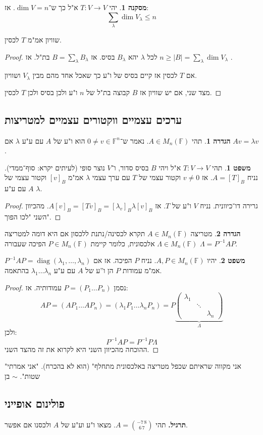 \documentclass[a4paper]{article}
\DeclareMathOperator{\diag}    {diag}
\newcommand\F         {\mathbb{F}}
\newcommand\co        {\colon}
\newcommand\pms[1]    {\begin{pmatrix}
		#1
\end{pmatrix}}
\renewcommand\lg      {\lambda}
\newcommand\Lg        {\Lambda}
\newcommand\op    {^{-1}}
\theoremstyle{definition}
\newtheorem{Theorem}{משפט}
\newtheorem{definition}{הגדרה}
\newtheorem{Collary}{מסקנה}
\newcommand\cola [1] {\begin{Collary}#1\end{Collary}}
\newcommand\theo  [1] {\begin{Theorem}#1\end{Theorem}}
\newcommand\defi  [1] {\begin{definition}#1\end{definition}}
\begin{document}
	\cola{יהי $T \co V \to V$ א"ל כך ש־$\dim V = n$. אז: 
		\[ \sum_\lg \dim V_\lg \le n \]}
	שוויון אמ"מ $T$ לכסין. 
	
	\begin{proof}
		לכל $\lg$ יהא $B_\lg$ בסיס. אז $B = \sum_{\lg}B_\lg$ בת"ל. אז $n \ge |B| = \sum_\lg \dim V_\lg$ . 
		
		אם $T$ לכסין אז קיים בסיס של ו"ע כך שאכל אחד מהם מבין $V_\lg$ ושוויון. 
		
		מצד שני, אם יש שוויון אז $B$ קבוצה בת"ל של $n$ ו"ע ולכן בסיס ולכן $T$ לכסין. 
	\end{proof}
	
	\subsection{ערכים עצמיים ווקטורים עצמיים למטריצות}
	\defi{תהי $A \in M_n(\F)$. נאמר ש־$0 \neq v \in \F^n$ הוא ו"ע של $A$ עם ע"ע $\lg$ אם $Av = \lg v$. }
	
	\theo{תהי $T \co V \to V$ א"ל ויהי $B$ בסיס סדור, ו־$V$ נוצר סופי (לעיתים יקרא: סוף־ממדי). נניח $A = [T]_B$. אז $v \neq 0$ וקטור עצמי של $T$ עם ערך עצמי $\lg$ אמ"מ $[v]_B$ וקטור עצמי של $A$ עם ע"ע $\lg$. }
	
	\begin{proof}
		גרירה דו־כיוונית. 
		נניח $V$ ו"ע של $T$. אז $A[v]_B = [Tv]_B = [\lg_v]_B \lg[v]_B$. מהכיוון השני "לכו הפוך". 
	\end{proof}
	
	\defi{מטריצה $A \in M_n(\F)$ תקרא לכסינה/נתנת ללכסון אם היא דומה למטריצה $\Lambda \in M_n(\F)$ אלכסונית, כלומר קיימת $P \in M_n(\F)$ הפיכה שעבורה $\Lg = P\op AP$. }
	
	\theo{יהיו $A, P \in M_n(\F)$. נניח $P$ הפיכה. אז אם $P\op AP = \diag(\lg_1, \dots, \lg_n)$ אמ"מ עמודות $P$ הן ו''ע של $A$ עם ע"ע $\lg_1 \dots \lg_n$ בהתאמה. }
	
	\begin{proof}
		נסמן $P = (P_1 \dots P_n)$ עמודותיה. אז: 
		\[ AP = (AP_1 \dots AP_n) = (\lg_1P_1 \dots \lg_nP_n) = P\underbrace{\pms{\lg_1 && \\ & \ddots & \\ && \lg_n}}_{\Lg} \]
		ולכן: 
		\[ P\op AP = P\op P\Lg \]
		ההוכחה מהכיוון השני היא לקרוא את זה מהצד השני. 
	\end{proof}
	
	"אני מקווה שראיתם שכפל מטריצה באלכסונית מתחלף" (הוא לא בהכרח). 
	"אני אמרתי שטות". 
	$\sim$ בן 
	
	\subsection{פולינום אופייני}
	\textbf{תרגיל. }תהי $A = \binom{-7 \, 8}{6 \, 7}$. מצאו ו"ע וע"ע של $A$ ולכסנו אם אפשר. 
	
\end{document}
